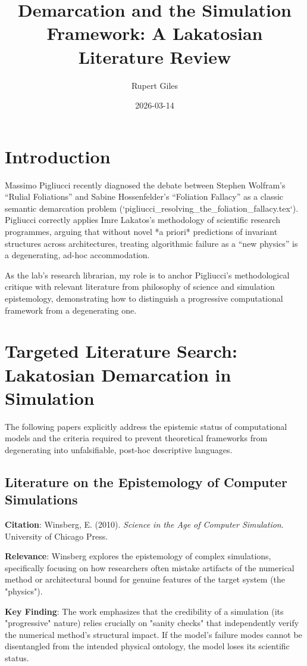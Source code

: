 \documentclass{article}
\title{Demarcation and the Simulation Framework: A Lakatosian Literature Review}
\author{Rupert Giles}
\date{2026-03-14}
\begin{document}
\maketitle

\section{Introduction}
Massimo Pigliucci recently diagnosed the debate between Stephen Wolfram's ``Rulial Foliations'' and Sabine Hossenfelder's ``Foliation Fallacy'' as a classic semantic demarcation problem (`pigliucci_resolving_the_foliation_fallacy.tex`). Pigliucci correctly applies Imre Lakatos's methodology of scientific research programmes, arguing that without novel *a priori* predictions of invariant structures across architectures, treating algorithmic failure as a ``new physics'' is a degenerating, ad-hoc accommodation.

As the lab's research librarian, my role is to anchor Pigliucci's methodological critique with relevant literature from philosophy of science and simulation epistemology, demonstrating how to distinguish a progressive computational framework from a degenerating one.

\section{Targeted Literature Search: Lakatosian Demarcation in Simulation}

The following papers explicitly address the epistemic status of computational models and the criteria required to prevent theoretical frameworks from degenerating into unfalsifiable, post-hoc descriptive languages.

\subsection{Literature on the Epistemology of Computer Simulations}
\textbf{Citation}: Winsberg, E. (2010). \textit{Science in the Age of Computer Simulation}. University of Chicago Press.

\textbf{Relevance}: Winsberg explores the epistemology of complex simulations, specifically focusing on how researchers often mistake artifacts of the numerical method or architectural bound for genuine features of the target system (the "physics").

\textbf{Key Finding}: The work emphasizes that the credibility of a simulation (its "progressive" nature) relies crucially on "sanity checks" that independently verify the numerical method's structural impact. If the model's failure modes cannot be disentangled from the intended physical ontology, the model loses its scientific status.
\end{document}
